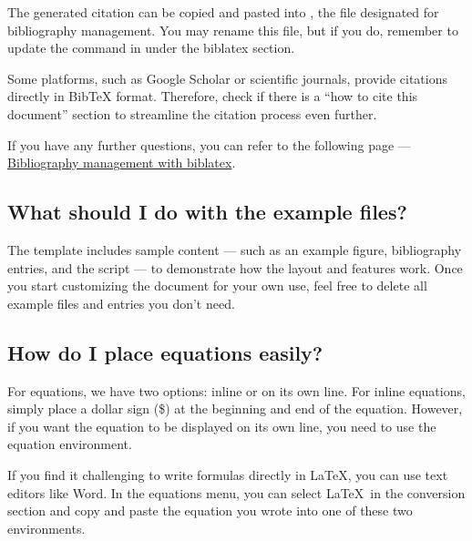 \documentclass[9pt,a4paper,twocolumn,twoside]{rho-class/rho}
\begin{document}
        The generated citation can be copied and pasted into , the file designated for bibliography management. You may rename this file, but if you do, remember to update the \inlinecode{} command in  under the biblatex section.
    
        \begin{note}
            Some platforms, such as Google Scholar or scientific journals, provide citations directly in BibTeX format. Therefore, check if there is a ``how to cite this document'' section to streamline the citation process even further.
        \end{note}

        If you have any further questions, you can refer to the following page — \href{https://es.overleaf.com/learn/latex/Bibliography_management_with_biblatex}{Bibliography management with biblatex}.
        
    \subsection*{What should I do with the example files?}

        The template includes sample content — such as an example figure, bibliography entries, and the  script — to demonstrate how the layout and features work. Once you start customizing the document for your own use, feel free to delete all example files and entries you don’t need.

    \subsection*{How do I place equations easily?}

        For equations, we have two options: inline or on its own line. For inline equations, simply place a dollar sign (\$) at the beginning and end of the equation. However, if you want the equation to be displayed on its own line, you need to use the equation environment.
        
        If you find it challenging to write formulas directly in \LaTeX, you can use text editors like Word. In the equations menu, you can select \LaTeX\ in the conversion section and copy and paste the equation you wrote into one of these two environments.
\end{document}
